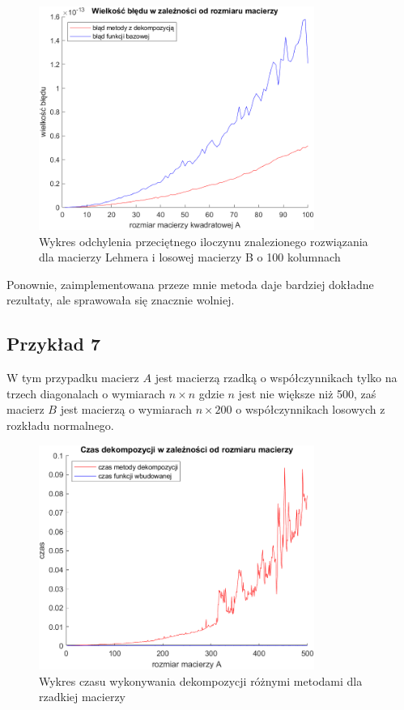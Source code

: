 \documentclass{article}
\begin{document}
\begin{figure}[htp]
\centering
  \centering
  \includegraphics[width=9cm]{wykresy/przyklad6.png}
  \caption{Wykres odchylenia przeciętnego iloczynu znalezionego rozwiązania \\
  dla macierzy Lehmera i losowej macierzy B o 100 kolumnach}
  \label{fig:sub1}
\label{fig:test}
\end{figure}

Ponownie, zaimplementowana przeze mnie metoda daje bardziej dokładne rezultaty, ale sprawowała się znacznie wolniej.
\newpage
\subsection*{Przykład 7}
W tym przypadku macierz $A$ jest macierzą rzadką o współczynnikach tylko na trzech diagonalach o wymiarach $n \times n$ gdzie $n$ jest nie większe niż 500, zaś macierz $B$ jest macierzą o wymiarach $n \times 200$ o współczynnikach losowych z rozkładu normalnego.




\begin{figure}[htp]
\centering
  \centering
  \includegraphics[width=9cm]{wykresy/przyklad7_1.png}
  \caption{Wykres czasu wykonywania dekompozycji różnymi metodami dla rzadkiej macierzy}
  \label{fig:sub1}
\label{fig:test}
\end{figure}
\end{document}
